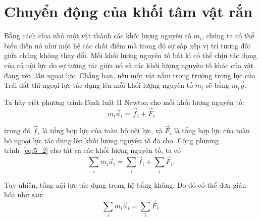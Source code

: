 \section{Chuyển động của khối tâm vật rắn}\label{sec:5_2}

Bằng cách chia nhỏ một vật thành các khối lượng nguyên tố $m_i$, chúng ta có thể biểu diễn nó như một hệ các chất điểm mà trong đó sự sắp xếp vị trí tương đối giữa chúng không thay đổi. Mỗi khối lượng nguyên tố bất kì có thể chịu tác dụng của cả nội lực do sự tương tác giữa nó và các khối lượng nguyên tố khác của vật đang xét, lẫn ngoại lực. Chẳng hạn, nếu một vật nằm trong trường trọng lực của Trái đất thì ngoại lực tác dụng lên mỗi khối lượng nguyên tố $m_i$ sẽ bằng $m_i\vec{g}$.

Ta hãy viết phương trình Định luật II Newton cho mỗi khối lượng nguyên tố:
\begin{equation}\label{eq:5_2}
m_i\vec{a}_i = \vec{f}_i + \vec{F}_i
\end{equation}

\noindent
trong đó $\vec{f}_i$ là tổng hợp lực của toàn bộ nội lực, và $\vec{F}_i$ là tổng hợp lực của toàn bộ ngoại lực tác dụng lên khối lượng nguyên tố đã cho. Cộng phương trình~\eqref{eq:5_2} cho tất cả các khối lượng nguyên tố, ta có
\begin{equation}\label{eq:5_3}
	\sum_i m_i\vec{a}_i = \sum_i \vec{f}_i + \sum_i \vec{F}_i.
\end{equation}

\noindent
Tuy nhiên, tổng nội lực tác dụng trong hệ bằng không. Do đó  có thể đơn giản hóa như sau:
\begin{equation}\label{eq:5_4}
	\sum_i m_i\vec{a}_i = \sum_i \vec{F}_i.
\end{equation}


